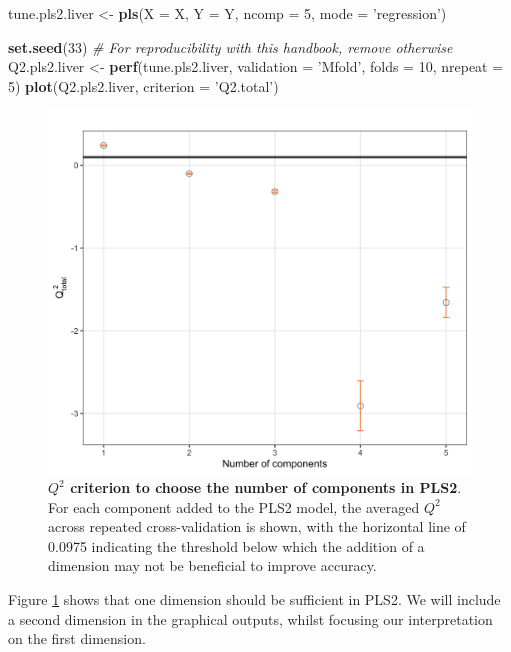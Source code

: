 \documentclass[]{book}
\newenvironment{Shaded}{\begin{snugshade}}{\end{snugshade}}
\newcommand{\CommentTok}[1]{\textcolor[rgb]{0.56,0.35,0.01}{\textit{#1}}}
\newcommand{\DataTypeTok}[1]{\textcolor[rgb]{0.13,0.29,0.53}{#1}}
\newcommand{\DecValTok}[1]{\textcolor[rgb]{0.00,0.00,0.81}{#1}}
\newcommand{\KeywordTok}[1]{\textcolor[rgb]{0.13,0.29,0.53}{\textbf{#1}}}
\newcommand{\NormalTok}[1]{#1}
\newcommand{\StringTok}[1]{\textcolor[rgb]{0.31,0.60,0.02}{#1}}
\begin{document}
\begin{Shaded}
\begin{Highlighting}[]
\NormalTok{tune.pls2.liver <-}\StringTok{ }\KeywordTok{pls}\NormalTok{(}\DataTypeTok{X =}\NormalTok{ X, }\DataTypeTok{Y =}\NormalTok{ Y, }\DataTypeTok{ncomp =} \DecValTok{5}\NormalTok{, }\DataTypeTok{mode =} \StringTok{'regression'}\NormalTok{)}

\KeywordTok{set.seed}\NormalTok{(}\DecValTok{33}\NormalTok{)  }\CommentTok{# For reproducibility with this handbook, remove otherwise}
\NormalTok{Q2.pls2.liver <-}\StringTok{ }\KeywordTok{perf}\NormalTok{(tune.pls2.liver, }\DataTypeTok{validation =} \StringTok{'Mfold'}\NormalTok{, }\DataTypeTok{folds =} \DecValTok{10}\NormalTok{, }
                      \DataTypeTok{nrepeat =} \DecValTok{5}\NormalTok{)}
\KeywordTok{plot}\NormalTok{(Q2.pls2.liver, }\DataTypeTok{criterion =} \StringTok{'Q2.total'}\NormalTok{)}
\end{Highlighting}
\end{Shaded}

\begin{figure}

{\centering \includegraphics[width=0.5\linewidth]{Figures/PLS/pls2-Q2-1} 

}

\caption{\textbf{\(Q^2\) criterion to choose the number of components in PLS2}. For each component added to the PLS2 model, the averaged \(Q^2\) across repeated cross-validation is shown, with the horizontal line of 0.0975 indicating the threshold below which the addition of a dimension may not be beneficial to improve accuracy.}\label{fig:pls2-Q2}
\end{figure}



Figure \ref{fig:pls2-Q2} shows that one dimension should be sufficient in PLS2. We will include a second dimension in the graphical outputs, whilst focusing our interpretation on the first dimension.
\end{document}
